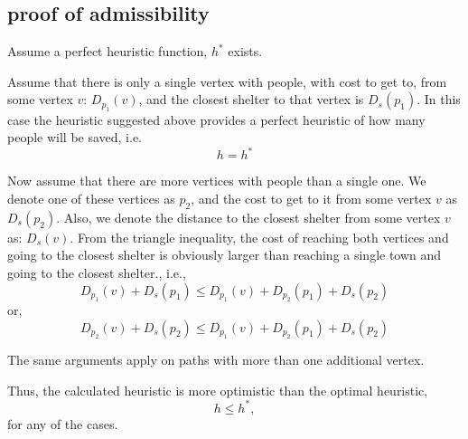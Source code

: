 \documentclass{article}                     %
\begin{document}
	\subsection{proof of admissibility}
	Assume a perfect heuristic function, $ h^* $ exists.
	
	Assume that there is only a single vertex with people, with cost to get to, from some vertex $v$: $ D_{p_1}(v) $, and the closest shelter to that vertex is $ D_{s}(p_1) $. In this case the heuristic suggested above provides a perfect heuristic of how many people will be saved, i.e.
	\begin{equation}
	h =  h^*
	\end{equation}
	
	Now assume that there are more vertices with people than a single one. We denote one of these vertices as ${p_2}$, and the cost to get to it from some vertex $v$ as $ D_{s}(p_2) $. Also, we denote the distance to the closest shelter from some vertex $v$ as: $D_{s}(v)$. From the triangle inequality, the cost of reaching both vertices and going to the closest shelter is obviously larger than reaching a single town and going to the closest shelter., i.e., 
	\begin{equation}\label{key}
	D_{p_1}(v)+D_{s}(p_1) \leq D_{p_1}(v) + D_{p_2}(p_1) + D_{s}(p_2)
	\end{equation}
	or,
	\begin{equation}\label{key}
	D_{p_2}(v)+D_{s}(p_2) \leq D_{p_1}(v) + D_{p_2}(p_1) + D_{s}(p_2)
	\end{equation}
	
	The same arguments apply on paths with more than one additional vertex.
	
	Thus, the calculated heuristic is more optimistic than the optimal heuristic, 
	\begin{equation}\label{key}
	h\leq h^*,
	\end{equation}
	for any of the cases.
\end{document}
